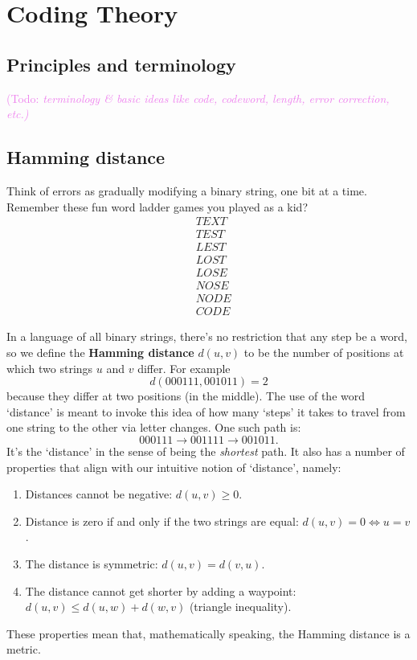\documentclass{article}
\theoremstyle{plain}
\theoremstyle{definition}
\theoremstyle{remark}
\numberwithin{theorem}{section}
\newcommand{\KS}[1]{\textcolor{violet}{{\sf (Todo:} {\sl{#1})}}}
\newcommand{\KS}[1]{}
\begin{document}
\section{Coding Theory}

\subsection{Principles and terminology}

\KS{terminology \& basic ideas like code, codeword, length, error correction, etc.}

\subsection{Hamming distance}

Think of errors as gradually modifying a binary string, one bit at a time.  Remember these fun word ladder games you played as a kid?
\begin{align*}
&TEXT \\
&TEST \\
&LEST \\
&LOST \\
&LOSE \\
&NOSE \\
&NODE \\
&CODE
\end{align*}

In a language of all binary strings, there's no restriction that any step be a word, so we define the \textbf{Hamming distance} $d(u,v)$ to be the number of positions at which two strings $u$ and $v$ differ.  For example
\[
d(000111,001011) = 2
\]
because they differ at two positions (in the middle).  The use of the word `distance' is meant to invoke this idea of how many `steps' it takes to travel from one string to the other via letter changes.  One such path is:
\[
000111 \rightarrow 001111 \rightarrow 001011.
\]
It's the `distance' in the sense of being the \emph{shortest} path.  It also has a number of properties that align with our intuitive notion of `distance', namely:
\begin{enumerate}
    \item Distances cannot be negative: $d(u,v) \ge 0$.
    \item Distance is zero if and only if the two strings are equal: $d(u,v) = 0 \Leftrightarrow u=v$.
    \item The distance is symmetric:  $d(u,v) = d(v,u)$.
    \item The distance cannot get shorter by adding a waypoint: $d(u,v) \le d(u,w) + d(w,v)$ (triangle inequality).
\end{enumerate}
These properties mean that, mathematically speaking, the Hamming distance is a metric.
\end{document}
